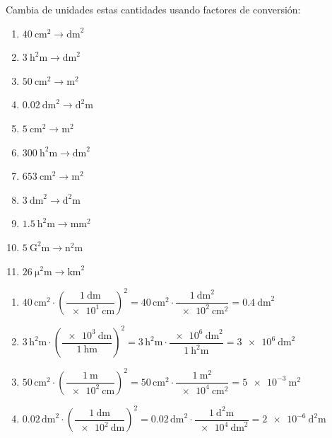 \begin{exercise}
    Cambia de unidades estas cantidades usando factores de conversión:
    \begin{enumerate}[label=\letraminuscula]
        \item \(\qty{40}{\square\cm} \to \unit{\square\dm}\)
        \item \(\qty{3}{\square\hecto\m} \to \unit{\square\dm}\)
        \item \(\qty{50}{\square\cm} \to \unit{\square\m}\)
        \item \(\qty{0.02}{\square\dm} \to \unit{\square\deca\m}\)
        \item \(\qty{5}{\square\cm} \to \unit{\square\m}\)
        \item \(\qty{300}{\square\hecto\m} \to \unit{\square\dm}\)
        \item \(\qty{653}{\square\cm} \to \unit{\square\m}\)
        \item \(\qty{3}{\square\dm} \to \unit{\square\deca\m}\)
        \item \(\qty{1.5}{\square\hecto\m} \to \unit{\square\mm}\)
        \item \(\qty{5}{\square\giga\m} \to \unit{\square\nano\m}\)
        \item \(\qty{26}{\square\micro\m} \to \unit{\square\km}\)
    \end{enumerate}
    \begin{solu}
        \begin{enumerate}[label=\alph*)]
            \item \(\num{40}\,\unit{\square\cm} \cdot \left(\dfrac{\qty{1}{\dm}}{\qty{e1}{\cm}}\right)^{2} = \num{40}\,\unit{\square\cm} \cdot \dfrac{\qty{1}{\square\dm}}{\qty{e2}{\square\cm}} = \qty{0.4}{\square\dm}\)
            \item \(\num{3}\,\unit{\square\hecto\m} \cdot \left(\dfrac{\qty{e3}{\dm}}{\qty{1}{\hecto\m}}\right)^{2} = \num{3}\,\unit{\square\hecto\m} \cdot \dfrac{\qty{e6}{\square\dm}}{\qty{1}{\square\hecto\m}} = \qty{3e6}{\square\dm}\)
            \item \(\num{50}\,\unit{\square\cm} \cdot \left(\dfrac{\qty{1}{\m}}{\qty{e2}{\cm}}\right)^{2} = \num{50}\,\unit{\square\cm} \cdot \dfrac{\qty{1}{\square\m}}{\qty{e4}{\square\cm}} = \qty{5e-3}{\square\m}\)
            \item \(\num{0.02}\,\unit{\square\dm} \cdot \left(\dfrac{\qty{1}{\deca\m}}{\qty{e2}{\dm}}\right)^{2} = \num{0.02}\,\unit{\square\dm} \cdot \dfrac{\qty{1}{\square\deca\m}}{\qty{e4}{\square\dm}} = \qty{2e-6}{\square\deca\m}\)

\end{enumerate}
\end{solu}
\end{exercise}
